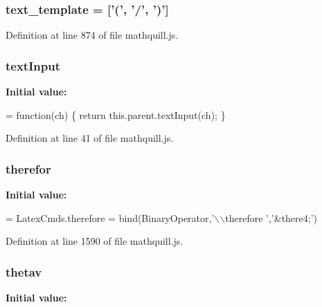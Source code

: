 \subsubsection[{text\-\_\-template}]{\setlength{\rightskip}{0pt plus 5cm}{\bf \-\_\-} text\-\_\-template = ['(', '/', ')']}\label{mathquill_8js_ab214b5cff209b1df8aff161be0b43e51}


Definition at line 874 of file mathquill.\-js.

\subsubsection[{text\-Input}]{\setlength{\rightskip}{0pt plus 5cm}{\bf \-\_\-} text\-Input}\label{mathquill_8js_a1991b11a0e1e730deee79fb11655f00d}
{\bfseries Initial value\-:}
\begin{DoxyCode}
= \textcolor{keyword}{function}(ch) \{
  \textcolor{keywordflow}{return} this.parent.textInput(ch);
\}
\end{DoxyCode}


Definition at line 41 of file mathquill.\-js.

\subsubsection[{therefor}]{ therefor}\label{mathquill_8js_ab6c9eef2ec786934bb2249ab90cca578}
{\bfseries Initial value\-:}
\begin{DoxyCode}
= LatexCmds.therefore =
  bind(BinaryOperator,\textcolor{stringliteral}{'\(\backslash\)\(\backslash\)therefore '},\textcolor{stringliteral}{'&there4;'})
\end{DoxyCode}


Definition at line 1590 of file mathquill.\-js.

\subsubsection[{thetav}]{ thetav}\label{mathquill_8js_a413932edd382a6569bc570dbf549b9f7}
{\bfseries Initial value\-:}


